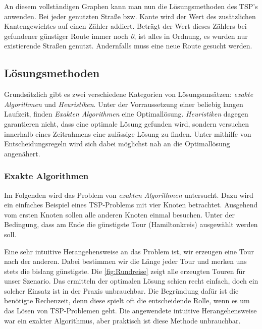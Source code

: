 \documentclass{article}
\begin{document}
An diesem vollständigen Graphen kann man nun die Lösungsmethoden des TSP's anwenden. Bei jeder genutzten Straße bzw. Kante wird der Wert des zusätzlichen Kantengewichtes auf einen Zähler addiert. Beträgt der Wert dieses Zählers bei gefundener günstiger Route immer noch \textit{0}, ist alles in Ordnung, es wurden nur existierende Straßen genutzt. Andernfalls muss eine neue Route gesucht werden.


\subsection{Lösungsmethoden}

Grundsätzlich gibt es zwei verschiedene Kategorien von Lösungsansätzen: \textit{exakte Algorithmen} und \textit{Heuristiken}. Unter der Vorraussetzung einer beliebig langen Laufzeit, finden \textit{Exakten Algorithmen} eine Optimallösung. \textit{Heuristiken} dagegen garantieren nicht, dass eine optimale Lösung gefunden wird, sondern versuchen innerhalb eines Zeitrahmens eine zulässige Lösung zu finden. Unter mithilfe von Entscheidungsregeln wird sich dabei möglichst nah an die Optimallösung angenähert.

\subsubsection{Exakte Algorithmen}
Im Folgenden wird das Problem von \textit{exakten Algorithmen} untersucht. Dazu wird ein einfaches Beispiel eines TSP-Problems mit vier Knoten betrachtet. Ausgehend vom ersten Knoten sollen alle anderen Knoten einmal besuchen. Unter der Bedingung, dass am Ende die günstigste Tour (Hamiltonkreis) ausgewählt werden soll.
\par Eine sehr intuitive Herangehensweise an das Problem ist, wir erzeugen eine Tour nach der anderen. Dabei bestimmen wir die Länge jeder Tour und merken uns stets die bislang günstigste. Die \autoref{fig:Rundreise} zeigt alle erzeugten Touren für unser Szenario. Das ermitteln der optimalen Lösung schien recht einfach, doch ein solcher Einsatz ist in der Praxis unbrauchbar. Die Begründung dafür ist die benötigte Rechenzeit, denn diese spielt oft die entscheidende Rolle, wenn es um das Lösen von TSP-Problemen geht. Die angewendete intuitive Herangehensweise war ein exakter Algorithmus, aber praktisch ist diese Methode unbrauchbar.
\end{document}
